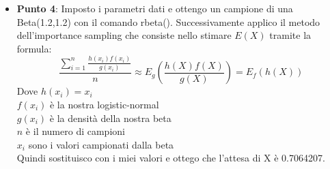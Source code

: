 \documentclass[a4paper,12pt]{article}
\begin{document}
\begin{itemize}
	\newpage
	\item \textbf{Punto 4}: Imposto i parametri dati e ottengo un campione di una Beta(1.2,1.2) con il comando rbeta().
	Successivamente applico il metodo dell’importance sampling che consiste nello stimare $E(X)$ tramite la formula:
	\[
	\frac{\sum_{i=1}^{n} \frac{h(x_i) f(x_i)}{g(x_i)}}{n} \approx E_g \left( \frac{h(X) f(X)}{g(X)} \right) = E_f(h(X))
	\]
	Dove $h(x_i)=x_i$ \\
	$f(x_i)$ è la nostra logistic-normal\\
    $g(x_i)$ è la densità della nostra beta\\
    $n$ è il numero di campioni \\
    $x_i$ sono i valori campionati dalla beta\\
    
    Quindi sostituisco con i miei valori e ottego che l'attesa di X è 0.7064207.
\end{itemize}
\end{document}
